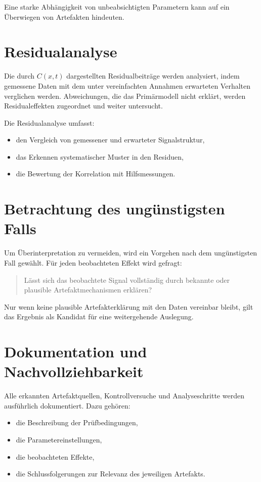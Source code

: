 \documentclass[12pt,a4paper]{report}
\begin{document}
Eine starke Abhängigkeit von unbeabsichtigten Parametern kann auf ein
Überwiegen von Artefakten hindeuten.

\section{Residualanalyse}

Die durch $C(x,t)$ dargestellten Residualbeiträge werden analysiert,
indem gemessene Daten mit dem unter vereinfachten Annahmen erwarteten
Verhalten verglichen werden. Abweichungen, die das Primärmodell nicht
erklärt, werden Residualeffekten zugeordnet und weiter untersucht.

Die Residualanalyse umfasst:

\begin{itemize}
\item den Vergleich von gemessener und erwarteter Signalstruktur,
\item das Erkennen systematischer Muster in den Residuen,
\item die Bewertung der Korrelation mit Hilfsmessungen.
\end{itemize}

\section{Betrachtung des ungünstigsten Falls}

Um Überinterpretation zu vermeiden, wird ein Vorgehen nach dem
ungünstigsten Fall gewählt. Für jeden beobachteten Effekt wird gefragt:

\begin{quote}
Lässt sich das beobachtete Signal vollständig durch bekannte oder
plausible Artefaktmechanismen erklären?
\end{quote}

Nur wenn keine plausible Artefakterklärung mit den Daten vereinbar
bleibt, gilt das Ergebnis als Kandidat für eine weitergehende Auslegung.

\section{Dokumentation und Nachvollziehbarkeit}

Alle erkannten Artefaktquellen, Kontrollversuche und Analyseschritte
werden ausführlich dokumentiert. Dazu gehören:

\begin{itemize}
\item die Beschreibung der Prüfbedingungen,
\item die Parametereinstellungen,
\item die beobachteten Effekte,
\item die Schlussfolgerungen zur Relevanz des jeweiligen Artefakts.
\end{itemize}
\end{document}
